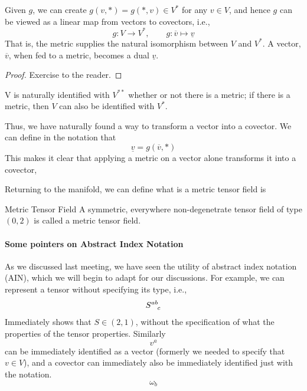 		Given $g$, we can create $g(v,*) = g(*,v)\in V^*$ for any $v\in V$, and hence $g$ can be
		viewed as a linear map from vectors to covectors, i.e.,
		\[
			g:V\to V^*,\qquad g:\overline{v}\mapsto \underline{v}
		\]
		That is, the metric supplies the natural isomorphism between $V$ and $V^*$. A vector, $\overline{v}$, when fed 
		to a metric, becomes a dual $\underline{v}$.
		\begin{proof}
		    Exercise to the reader.
		\end{proof}
		V is naturally identified with $V^{**}$ whether or not there is a metric; if there is a metric,
		then $V$ can also be identified with $V^*$. 

		Thus, we have naturally found a way to transform a vector 
		into a covector. We can define in the notation that
		\[
			\underline{v} = g(\overline{v},*)
		\]
		This makes it clear that applying a metric on a vector alone transforms it into a covector,
	
		Returning to the manifold, we can define what is a metric tensor field is
		\begin{definition}{Metric Tensor Field}
		    A symmetric, everywhere non-degenetrate tensor field of type $(0,2)$ 
			is called a metric tensor field.
		\end{definition}		

	\paragraph{Some pointers on Abstract Index Notation}
		As we discussed last meeting, we have seen the utility of 
		abstract index notation (AIN), which we will begin to adapt for our discussions.
		For example, we can represent a tensor without specifying its type, i.e.,
		\[
			S\indices{^{ab}_c}
		\]
		Immediately shows that $S\in(2,1)$, without the specification of what the properties 
		of the tensor properties. Similarly
		\[
			v^a
		\]
		can be immediately identified as a vector (formerly we needed to specify that $v\in V$),
		and a covector can immediately also be immediately identified just with the notation.
		\[
			\omega_b
		\]

